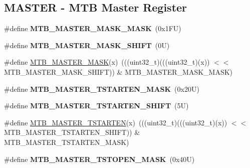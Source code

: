 \subsection*{M\+A\+S\+T\+ER -\/ M\+TB Master Register}
\begin{DoxyCompactItemize}
\item 
\mbox{\label{group___m_t_b___register___masks_ga718f776541b94b2e942aac9479a60963}} 
\#define {\bfseries M\+T\+B\+\_\+\+M\+A\+S\+T\+E\+R\+\_\+\+M\+A\+S\+K\+\_\+\+M\+A\+SK}~(0x1\+F\+U)
\item 
\mbox{\label{group___m_t_b___register___masks_gad437c892ab8b61d2ffb4cd86dd2aa9b5}} 
\#define {\bfseries M\+T\+B\+\_\+\+M\+A\+S\+T\+E\+R\+\_\+\+M\+A\+S\+K\+\_\+\+S\+H\+I\+FT}~(0\+U)
\item 
\#define \mbox{\hyperlink{group___m_t_b___register___masks_ga58835f546d852779402878c8f30204c5}{M\+T\+B\+\_\+\+M\+A\+S\+T\+E\+R\+\_\+\+M\+A\+SK}}(x)~(((uint32\+\_\+t)(((uint32\+\_\+t)(x)) $<$$<$ M\+T\+B\+\_\+\+M\+A\+S\+T\+E\+R\+\_\+\+M\+A\+S\+K\+\_\+\+S\+H\+I\+FT)) \& M\+T\+B\+\_\+\+M\+A\+S\+T\+E\+R\+\_\+\+M\+A\+S\+K\+\_\+\+M\+A\+SK)
\item 
\mbox{\label{group___m_t_b___register___masks_gace5fa3a07ba94b52b019ba4adf6ded1d}} 
\#define {\bfseries M\+T\+B\+\_\+\+M\+A\+S\+T\+E\+R\+\_\+\+T\+S\+T\+A\+R\+T\+E\+N\+\_\+\+M\+A\+SK}~(0x20\+U)
\item 
\mbox{\label{group___m_t_b___register___masks_ga7ffc111a955bf51244819ab23048d2e9}} 
\#define {\bfseries M\+T\+B\+\_\+\+M\+A\+S\+T\+E\+R\+\_\+\+T\+S\+T\+A\+R\+T\+E\+N\+\_\+\+S\+H\+I\+FT}~(5\+U)
\item 
\#define \mbox{\hyperlink{group___m_t_b___register___masks_ga970e201bcaf074c3776157ccff0efac3}{M\+T\+B\+\_\+\+M\+A\+S\+T\+E\+R\+\_\+\+T\+S\+T\+A\+R\+T\+EN}}(x)~(((uint32\+\_\+t)(((uint32\+\_\+t)(x)) $<$$<$ M\+T\+B\+\_\+\+M\+A\+S\+T\+E\+R\+\_\+\+T\+S\+T\+A\+R\+T\+E\+N\+\_\+\+S\+H\+I\+FT)) \& M\+T\+B\+\_\+\+M\+A\+S\+T\+E\+R\+\_\+\+T\+S\+T\+A\+R\+T\+E\+N\+\_\+\+M\+A\+SK)
\item 
\mbox{\label{group___m_t_b___register___masks_ga6497971415da774904dac543bebf23bb}} 
\#define {\bfseries M\+T\+B\+\_\+\+M\+A\+S\+T\+E\+R\+\_\+\+T\+S\+T\+O\+P\+E\+N\+\_\+\+M\+A\+SK}~(0x40\+U)

\end{DoxyCompactItemize}
